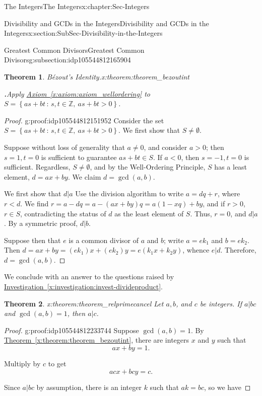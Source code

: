 \documentclass[oneside,10pt,]{book}
\newcommand{\blocktitlefont}{\relax}
\newcommand{\xreffont}{\relax}
\numberwithin{equation}{section}
\newcommand{\setof}[2]{{\left\{#1\,\colon\,#2\right\}}}
\def\Z{{\mathbb Z}}
\newtheorem{theorem}{Theorem}[section]
\newcommand{\lt}{<}
\newcommand{\gt}{>}
\begin{document}
\begin{chapterptx}{The Integers}{}{The Integers}{}{}{x:chapter:Sec-Integers}
\begin{sectionptx}{Divisibility and GCDs in the Integers}{}{Divisibility and GCDs in the Integers}{}{}{x:section:SubSec-Divisibility-in-the-Integers}
\begin{subsectionptx}{Greatest Common Divisors}{}{Greatest Common Divisors}{}{}{g:subsection:idp105544812165904}
\begin{theorem}{Bézout's Identity.}{}{x:theorem:theorem_bezoutint}
\par\smallskip%
\noindent\textbf{\blocktitlefont 2.}\quad{}Apply \hyperref[x:axiom:axiom_wellordering]{Axiom~{\xreffont\ref{x:axiom:axiom_wellordering}}} to \(S = \setof{as+bt}{s,t\in\Z, \ as+bt \gt 0}\).%
\end{theorem}
\begin{proof}{}{g:proof:idp105544812151952}
Consider the set \(S = \setof{as+bt}{s,t\in\Z, \ as+bt \gt 0}\). We first show that \(S\ne \emptyset\).%
\par
Suppose without loss of generality that \(a\ne 0\), and consider \(a \gt 0\); then \(s=1, t = 0\) is sufficient to guarantee \(as+bt\in S\). If \(a \lt 0\), then \(s = -1, t= 0\) is sufficient. Regardless, \(S\ne \emptyset\), and by the Well-Ordering Principle, \(S\) has a least element, \(d = ax+by\). We claim \(d = \gcd(a,b)\).%
\par
We first show that \(d|a\) Use the division algorithm to write \(a = dq + r\), where \(r \lt d\). We find \(r = a - dq = a - (ax+by)q = a(1-xq) + by\), and if \(r\gt 0\), \(r\in S\), contradicting the status of \(d\) as the least element of \(S\). Thus, \(r = 0\), and \(d|a\). By a symmetric proof, \(d|b\).%
\par
Suppose then that \(e\) is a common divisor of \(a\) and \(b\); write \(a = e k_1\) and \(b = e k_2\). Then \(d = ax + by = (ek_1)x + (ek_2)y = e(k_1x + k_2 y)\), whence \(e|d\). Therefore, \(d = \gcd(a,b)\).%
\end{proof}
We conclude with an answer to the questions raised by \hyperref[x:investigation:invest-divideproduct]{Investigation~{\xreffont\ref{x:investigation:invest-divideproduct}}}.%
\begin{theorem}{}{}{x:theorem:theorem_relprimecancel}%
Let \(a, b\), and \(c\) be integers. If \(a|bc\) and \(\gcd(a,b) = 1\), then \(a|c\).%
\end{theorem}
\begin{proof}{}{g:proof:idp105544812233744}
Suppose \(\gcd(a,b) = 1\). By \hyperref[x:theorem:theorem_bezoutint]{Theorem~{\xreffont\ref{x:theorem:theorem_bezoutint}}}, there are integers \(x\) and \(y\) such that%
\begin{equation*}
ax+by = 1\text{.}
\end{equation*}
%
\par
Multiply by \(c\) to get%
\begin{equation*}
acx + bcy = c\text{.}
\end{equation*}
%
\par
Since \(a|bc\) by assumption, there is an integer \(k\) such that \(ak = bc\), so we have%

\end{proof}
\end{subsectionptx}
\end{sectionptx}
\end{chapterptx}
\end{document}

